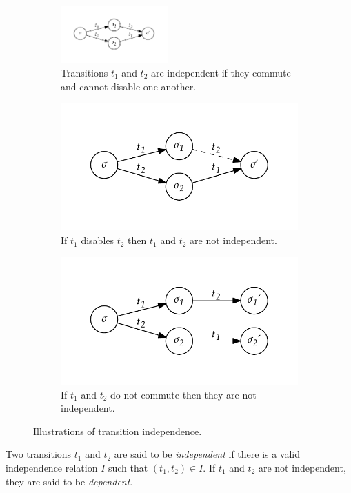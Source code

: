 \documentclass[12pt,a4paper,twoside,openright]{report}
\begin{document}
\begin{figure}
	\centering
	\begin{subfigure}{\textwidth}
		\centering
		\includegraphics*[width=0.45\textwidth]{independence1}
		\caption{Transitions $t_1$ and $t_2$ are independent if
			they commute and cannot disable one another.}
	\end{subfigure}
	\begin{subfigure}{.45\textwidth}
		\centering
		\includegraphics*[width=\textwidth]{independence2}
		\caption{If $t_1$ disables $t_2$ then $t_1$ and $t_2$
			are not independent.}
	\end{subfigure}
	\quad
	\begin{subfigure}{.45\textwidth}
		\centering
		\includegraphics*[width=\textwidth]{independence3}
		\caption{If $t_1$ and $t_2$ do not commute then they
			are not independent.}
	\end{subfigure}
	\caption{Illustrations of transition independence.}
	\label{fig:independence}
\end{figure}
Two transitions $t_1$ and $t_2$ are said to be \emph{independent}
if there is a valid independence relation $I$ such that $(t_1, t_2) \in I$.
If $t_1$ and $t_2$ are not independent, they are said to be \emph{dependent}.
\end{document}
